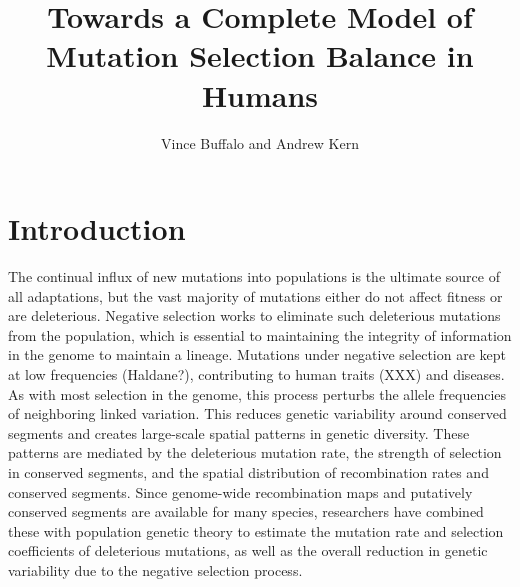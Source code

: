\documentclass[11pt]{article}
\title{Towards a Complete Model of Mutation Selection Balance in Humans}
\author{Vince Buffalo and Andrew Kern}
\begin{document}
\maketitle



\begin{abstract} 

\end{abstract}


\section*{Introduction}

The continual influx of new mutations into populations is the ultimate source
of all adaptations, but the vast majority of mutations either do not affect
fitness or are deleterious. Negative selection works to eliminate such
deleterious mutations from the population, which is essential to maintaining
the integrity of information in the genome to maintain a lineage. Mutations
under negative selection are kept at low frequencies (Haldane?), contributing
to human traits (XXX) and diseases. As with most selection in the genome, this
process perturbs the allele frequencies of neighboring linked variation. This
reduces genetic variability around conserved segments and creates large-scale
spatial patterns in genetic diversity. These patterns are mediated by the
deleterious mutation rate, the strength of selection in conserved segments, and
the spatial distribution of recombination rates and conserved segments. Since
genome-wide recombination maps and putatively conserved segments are available
for many species, researchers have combined these with population genetic
theory to estimate the mutation rate and selection coefficients of deleterious
mutations, as well as the overall reduction in genetic variability due to the
negative selection process.
\end{document}
